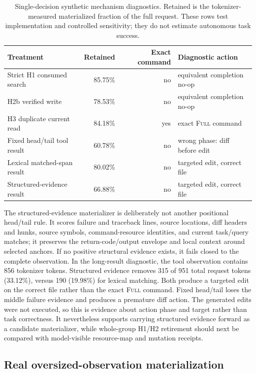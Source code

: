 \documentclass[11pt]{article}
\begin{document}
\begin{table}[H]
\centering
\small
\begin{tabular}{lrrl}
\toprule
Treatment & Retained & Exact command & Diagnostic action \\
\midrule
Strict H1 consumed search & 85.75\% & no & equivalent completion no-op \\
H2b verified write & 78.53\% & no & equivalent completion no-op \\
H3 duplicate current read & 84.18\% & yes & exact \textsc{Full} command \\
Fixed head/tail tool result & 60.78\% & no & wrong phase: diff before edit \\
Lexical matched-span result & 80.02\% & no & targeted edit, correct file \\
Structured-evidence result & 66.88\% & no & targeted edit, correct file \\
\bottomrule
\end{tabular}
\caption{Single-decision synthetic mechanism diagnostics. Retained is the
tokenizer-measured materialized fraction of the full request. These rows test
implementation and controlled sensitivity; they do not estimate autonomous
task success.}
\label{tab:synthetic-diagnostics}
\end{table}

The structured-evidence materializer is deliberately not another positional
head/tail rule. It scores failure and traceback lines, source locations, diff
headers and hunks, source symbols, command-resource identities, and current
task/query matches; it preserves the return-code/output envelope and local
context around selected anchors. If no positive structural evidence exists, it
fails closed to the complete observation. In the long-result diagnostic, the
tool observation contains 856 tokenizer tokens. Structured evidence removes
315 of 951 total request tokens (33.12\%), versus 190 (19.98\%) for lexical
matching. Both produce a targeted edit on the correct file rather than the
exact \textsc{Full} command. Fixed head/tail loses the middle failure evidence
and produces a premature diff action. The generated edits were not executed,
so this is evidence about action phase and target rather than task correctness.
It nevertheless supports carrying structured evidence forward as a candidate
materializer, while whole-group H1/H2 retirement should next be compared with
model-visible resource-map and mutation receipts.

\subsection{Real oversized-observation materialization}
\end{document}
